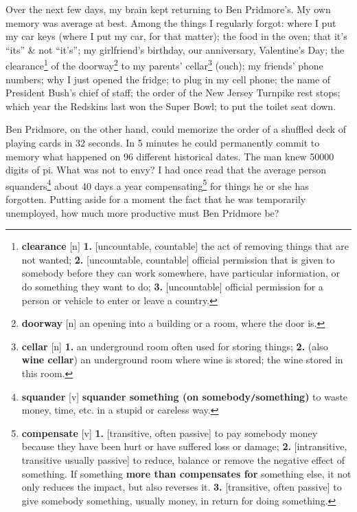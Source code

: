 \documentclass[oneside]{book}
\numberwithin{equation}{section}
\begin{document}
Over the next few days, my brain kept returning to Ben Pridmore's. My own memory was average at best. Among the things I regularly forgot: where I put my car keys (where I put my car, for that matter); the food in the oven; that it's ``its'' \& not ``it's''; my girlfriend's birthday, our anniversary, Valentine's Day; the clearance\footnote{\textbf{clearance} [n] \textbf{1.} [uncountable, countable] the act of removing things that are not wanted; \textbf{2.} [uncountable, countable] official permission that is given to somebody before they can work somewhere, have particular information, or do something they want to do; \textbf{3.} [uncountable] official permission for a person or vehicle to enter or leave a country.} of the doorway\footnote{\textbf{doorway} [n] an opening into a building or a room, where the door is.} to my parents' cellar\footnote{\textbf{cellar} [n] \textbf{1.} an underground room often used for storing things; \textbf{2.} (also \textbf{wine cellar}) an underground room where wine is stored; the wine stored in this room.} (ouch); my friends' phone numbers; why I just opened the fridge; to plug in my cell phone; the name of President Bush's chief of staff; the order of the New Jersey Turnpike rest stops; which year the Redskins last won the Super Bowl; to put the toilet seat down.

Ben Pridmore, on the other hand, could memorize the order of a shuffled deck of playing cards in 32 seconds. In 5 minutes he could permanently commit to memory what happened on 96 different historical dates. The man knew 50000 digits of pi. What was not to envy? I had once read that the average person squanders\footnote{\textbf{squander} [v] \textbf{squander something (on somebody\texttt{/}something)} to waste money, time, etc. in a stupid or careless way.} about 40 days a year compensating\footnote{\textbf{compensate} [v] \textbf{1.} [transitive, often passive] to pay somebody money because they have been hurt or have suffered loss or damage; \textbf{2.} [intransitive, transitive usually passive] to reduce, balance or remove the negative effect of something. If something \textbf{more than compensates for} something else, it not only reduces the impact, but also reverses it. \textbf{3.} [transitive, often passive] to give somebody something, usually money, in return for doing something.} for things he or she has forgotten. Putting aside for a moment the fact that he was temporarily unemployed, how much more productive must Ben Pridmore be?
\end{document}
